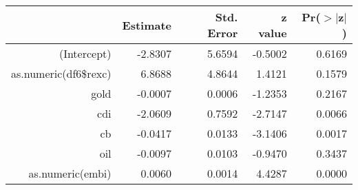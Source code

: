 \begin{table}[ht]
\centering
\begin{tabular}{rrrrr}
  \hline
 & Estimate & Std. Error & z value & Pr($>$$|$z$|$) \\ 
  \hline
(Intercept) & -2.8307 & 5.6594 & -0.5002 & 0.6169 \\ 
  as.numeric(df6\$rexc) & 6.8688 & 4.8644 & 1.4121 & 0.1579 \\ 
  gold & -0.0007 & 0.0006 & -1.2353 & 0.2167 \\ 
  cdi & -2.0609 & 0.7592 & -2.7147 & 0.0066 \\ 
  cb & -0.0417 & 0.0133 & -3.1406 & 0.0017 \\ 
  oil & -0.0097 & 0.0103 & -0.9470 & 0.3437 \\ 
  as.numeric(embi) & 0.0060 & 0.0014 & 4.4287 & 0.0000 \\ 
   \hline
\end{tabular}
\end{table}
